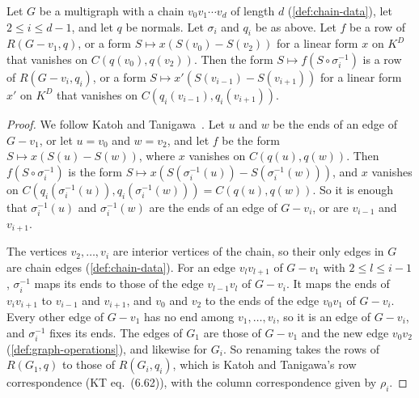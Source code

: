 \begin{lemma}
  \label{lem:case-III-chain-relabel-rows}
  \leanok
  Let $G$ be a multigraph with a chain $v_0 v_1 \cdots v_d$ of length $d$
  (\cref{def:chain-data}), let $2 \le i \le d - 1$, and let $q$ be
  normals. Let $\sigma_i$ and $q_i$ be as above. Let $f$ be a row of
  $R(G - v_1, q)$, or a form $S \mapsto x(S(v_0) - S(v_2))$ for a linear
  form $x$ on $K^D$ that vanishes on $C(q(v_0), q(v_2))$. Then the form
  $S \mapsto f(S \circ \sigma_i^{-1})$ is a row of $R(G - v_i, q_i)$, or
  a form $S \mapsto x'(S(v_{i-1}) - S(v_{i+1}))$ for a linear form $x'$
  on $K^D$ that vanishes on $C(q_i(v_{i-1}), q_i(v_{i+1}))$.
\end{lemma}
\begin{proof}
  \leanok
  We follow Katoh and Tanigawa~\cite[pp.~694--696]{katohTanigawa2011}.
  Let $u$ and $w$ be the ends of an edge of $G - v_1$, or let $u = v_0$
  and $w = v_2$, and let $f$ be the form $S \mapsto x(S(u) - S(w))$, where
  $x$ vanishes on $C(q(u), q(w))$. Then $f(S \circ \sigma_i^{-1})$ is the
  form $S \mapsto x(S(\sigma_i^{-1}(u)) - S(\sigma_i^{-1}(w)))$, and $x$
  vanishes on
  $C(q_i(\sigma_i^{-1}(u)), q_i(\sigma_i^{-1}(w))) = C(q(u), q(w))$. So
  it is enough that $\sigma_i^{-1}(u)$ and $\sigma_i^{-1}(w)$ are the ends
  of an edge of $G - v_i$, or are $v_{i-1}$ and $v_{i+1}$.

  The vertices $v_2, \dots, v_i$ are interior vertices of the chain, so
  their only edges in $G$ are chain edges (\cref{def:chain-data}). For an
  edge $v_l v_{l+1}$ of $G - v_1$ with $2 \le l \le i - 1$,
  $\sigma_i^{-1}$ maps its ends to those of the edge $v_{l-1} v_l$ of
  $G - v_i$. It maps the ends of $v_i v_{i+1}$ to $v_{i-1}$ and
  $v_{i+1}$, and $v_0$ and $v_2$ to the ends of the edge $v_0 v_1$ of
  $G - v_i$. Every other edge of $G - v_1$ has no end among
  $v_1, \dots, v_i$, so it is an edge of $G - v_i$, and $\sigma_i^{-1}$
  fixes its ends. The edges of $G_1$ are those of $G - v_1$ and the new
  edge $v_0 v_2$ (\cref{def:graph-operations}), and likewise for $G_i$.
  So renaming takes the rows of $R(G_1, q)$ to those of $R(G_i, q_i)$,
  which is Katoh and Tanigawa's row correspondence (KT eq.~(6.62)), with
  the column correspondence given by $\rho_i$.
\end{proof}

